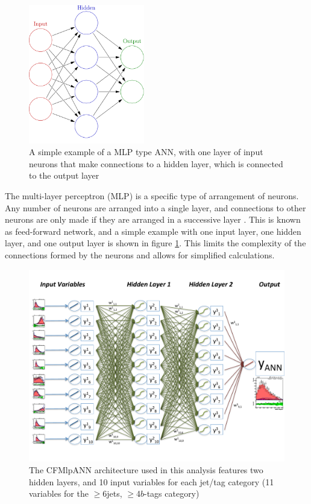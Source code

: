 \begin{figure}[hbtp]
 \begin{center}
   \includegraphics[width=0.45\textwidth]{Figures/Analysis_1_Diagrams/ANN_simple.png}
   \caption{A simple example of a MLP type ANN, with one layer of
     input neurons that make connections to a hidden layer, which is
     connected to the output layer}
   \label{fig:mlp_simple}
 \end{center}
\end{figure}

\par The multi-layer perceptron (MLP) is a specific type of
arrangement of neurons.  Any number of neurons are arranged into a
single layer, and connections to other neurons are only made if they
are arranged in a successive layer \cite{Hocker:2007ht}.  This is
known as feed-forward network, and a simple example with one input
layer, one hidden layer, and one output layer is shown in figure
\ref{fig:mlp_simple}.  This limits the complexity of the connections
formed by the neurons and allows for simplified calculations.  

\begin{figure}[hbtp]
 \begin{center}
   \includegraphics[width=1.0\textwidth]{Figures/Analysis_1_Diagrams/CFMlpANN_Architecture.pdf}
   \caption{The CFMlpANN architecture used in this analysis features
     two hidden layers, and 10 input variables for each jet/tag
     category (11 variables for the $\ge$6jets, $\ge$4$b$-tags
     category)}
   \label{fig:cfmlpann_arch}
 \end{center}
\end{figure}

